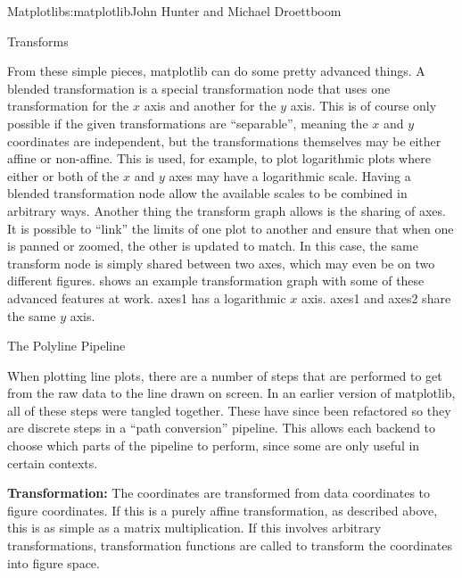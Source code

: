 \begin{aosachapter}{Matplotlib}{s:matplotlib}{John Hunter and Michael Droettboom}
\begin{aosasect1}{Transforms}

From these simple pieces, matplotlib can do some pretty advanced
things.  A blended transformation is a special transformation node
that uses one transformation for the $x$ axis and another for the $y$
axis.  This is of course only possible if the given transformations
are ``separable'', meaning the $x$ and $y$ coordinates are
independent, but the transformations themselves may be either affine
or non-affine.  This is used, for example, to plot logarithmic plots
where either or both of the $x$ and $y$ axes may have a logarithmic
scale.  Having a blended transformation node allow the available
scales to be combined in arbitrary ways.  Another thing the transform
graph allows is the sharing of axes.  It is possible to ``link'' the
limits of one plot to another and ensure that when one is panned or
zoomed, the other is updated to match.  In this case, the same
transform node is simply shared between two axes, which may even be on
two different figures.  
shows an example transformation graph with some of these advanced
features at work.  axes1 has a logarithmic $x$ axis.  axes1 and axes2
share the same $y$ axis.


\end{aosasect1}

\begin{aosasect1}{The Polyline Pipeline}

When plotting line plots, there are a number of steps that are
performed to get from the raw data to the line drawn on screen.  In an
earlier version of matplotlib, all of these steps were tangled
together.  These have since been refactored so they are discrete steps
in a ``path conversion'' pipeline.  This allows each backend to choose
which parts of the pipeline to perform, since some are only useful in
certain contexts.

\begin{aosaenumerate}

\item \textbf{Transformation:} The coordinates are transformed from data
  coordinates to figure coordinates.  If this is a purely affine
  transformation, as described above, this is as simple as a matrix
  multiplication.  If this involves arbitrary transformations,
  transformation functions are called to transform the coordinates
  into figure space.


\end{aosaenumerate}
\end{aosasect1}
\end{aosachapter}
